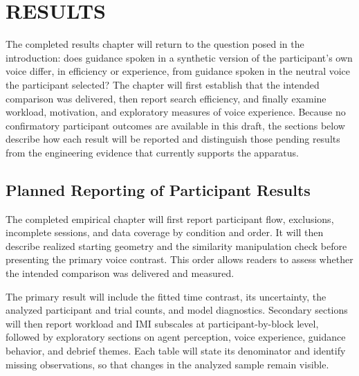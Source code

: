 \chapter{RESULTS}
\label{ch:evaluation}
The completed results chapter will return to the question posed in the introduction: does guidance spoken in a synthetic version of the participant's own voice differ, in efficiency or experience, from guidance spoken in the neutral voice the participant selected? The chapter will first establish that the intended comparison was delivered, then report search efficiency, and finally examine workload, motivation, and exploratory measures of voice experience. Because no confirmatory participant outcomes are available in this draft, the sections below describe how each result will be reported and distinguish those pending results from the engineering evidence that currently supports the apparatus.

\section{Planned Reporting of Participant Results}
The completed empirical chapter will first report participant flow, exclusions, incomplete sessions, and data coverage by condition and order. It will then describe realized starting geometry and the similarity manipulation check before presenting the primary voice contrast. This order allows readers to assess whether the intended comparison was delivered and measured.

The primary result will include the fitted time contrast, its uncertainty, the analyzed participant and trial counts, and model diagnostics. Secondary sections will then report workload and IMI subscales at participant-by-block level, followed by exploratory sections on agent perception, voice experience, guidance behavior, and debrief themes. Each table will state its denominator and identify missing observations, so that changes in the analyzed sample remain visible.

